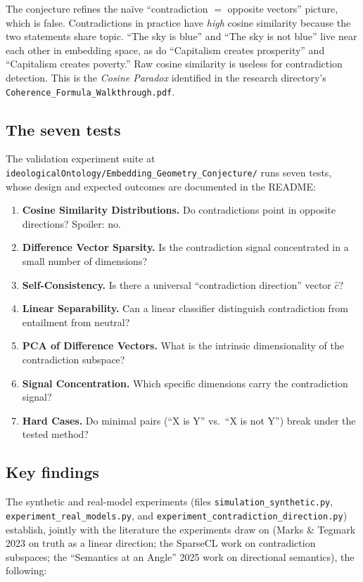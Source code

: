 \documentclass[11pt,letterpaper]{article}
\newcommand{\file}[1]{\texttt{#1}}
\begin{document}
The conjecture refines the na\"ive ``contradiction $=$ opposite vectors'' picture, which is false. Contradictions in practice have \emph{high} cosine similarity because the two statements share topic. ``The sky is blue'' and ``The sky is not blue'' live near each other in embedding space, as do ``Capitalism creates prosperity'' and ``Capitalism creates poverty.'' Raw cosine similarity is useless for contradiction detection. This is the \emph{Cosine Paradox} identified in the research directory's \file{Coherence\_Formula\_Walkthrough.pdf}.

\subsection{The seven tests}

The validation experiment suite at \file{ideologicalOntology/Embedding\_Geometry\_Conjecture/} runs seven tests, whose design and expected outcomes are documented in the README:

\begin{enumerate}[leftmargin=1.5em,itemsep=0.15em]
\item \textbf{Cosine Similarity Distributions.} Do contradictions point in opposite directions? Spoiler: no.
\item \textbf{Difference Vector Sparsity.} Is the contradiction signal concentrated in a small number of dimensions?
\item \textbf{Self-Consistency.} Is there a universal ``contradiction direction'' vector $\hat{c}$?
\item \textbf{Linear Separability.} Can a linear classifier distinguish contradiction from entailment from neutral?
\item \textbf{PCA of Difference Vectors.} What is the intrinsic dimensionality of the contradiction subspace?
\item \textbf{Signal Concentration.} Which specific dimensions carry the contradiction signal?
\item \textbf{Hard Cases.} Do minimal pairs (``X is Y'' vs.\ ``X is not Y'') break under the tested method?
\end{enumerate}

\subsection{Key findings}

The synthetic and real-model experiments (files \file{simulation\_synthetic.py}, \file{experiment\_real\_models.py}, and \file{experiment\_contradiction\_direction.py}) establish, jointly with the literature the experiments draw on (Marks \& Tegmark 2023 on truth as a linear direction; the SparseCL work on contradiction subspaces; the ``Semantics at an Angle'' 2025 work on directional semantics), the following:
\end{document}
